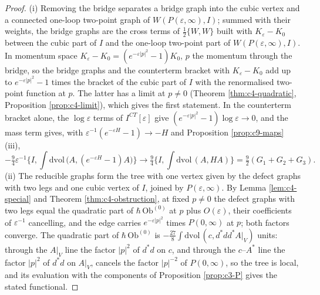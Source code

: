\begin{proof}
(i) Removing the bridge separates a bridge graph into the cubic vertex and a connected one-loop two-point graph of $W(P(\varepsilon,\infty),I)$; summed with their weights, the bridge graphs are the cross terms of $\tfrac12\{W,W\}$ built with $K_\varepsilon-K_0$ between the cubic part of $I$ and the one-loop two-point part of $W(P(\varepsilon,\infty),I)$. In momentum space $K_\varepsilon-K_0=(e^{-\varepsilon|p|^2}-1)K_0$, $p$ the momentum through the bridge, so the bridge graphs and the counterterm bracket with $K_\varepsilon-K_0$ add up to $e^{-\varepsilon|p|^2}-1$ times the bracket of the cubic part of $I$ with the renormalised two-point function at $p$. The latter has a limit at $p\neq0$ (Theorem \ref{thm:c4-quadratic}, Proposition \ref{prop:c4-limit}), which gives the first statement. In the counterterm bracket alone, the $\log\varepsilon$ terms of $I^{CT}[\varepsilon]$ give $(e^{-\varepsilon|p|^2}-1)\log\varepsilon\to0$, and the mass term gives, with $\varepsilon^{-1}(e^{-\varepsilon H}-1)\to-H$ and Proposition \ref{prop:c9-maps} (iii),
\[
-\tfrac94\varepsilon^{-1}\Big\{I,\int\mathrm{dvol}\,\big(A,(e^{-\varepsilon H}-1)A\big)\Big\}\longrightarrow\tfrac94\Big\{I,\int\mathrm{dvol}\,(A,HA)\Big\}=\tfrac92(G_1+G_2+G_3).
\]
(ii) The reducible graphs form the tree with one vertex given by the defect graphs with two legs and one cubic vertex of $I$, joined by $P(\varepsilon,\infty)$. By Lemma \ref{lem:c4-special} and Theorem \ref{thm:c4-obstruction}, at fixed $p\neq0$ the defect graphs with two legs equal the quadratic part of $\hbar\,\mathrm{Ob}^{(0)}$ at $p$ plus $O(\varepsilon)$, their coefficients of $\varepsilon^{-1}$ cancelling, and the edge carries $e^{-\varepsilon|p|^2}$ times $P(0,\infty)$ at $p$; both factors converge. The quadratic part of $\hbar\,\mathrm{Ob}^{(0)}$ is $-\tfrac{27}8\int\mathrm{dvol}\,(c,d^*dd^*A|_V)$ units: through the $A|_V$ line the factor $|p|^2$ of $d^*d$ on $c$, and through the $c$--$A^*$ line the factor $|p|^2$ of $d^*d$ on $A|_V$, cancels the factor $|p|^{-2}$ of $P(0,\infty)$, so the tree is local, and its evaluation with the components of Proposition \ref{prop:c3-P} gives the stated functional.
\end{proof}

